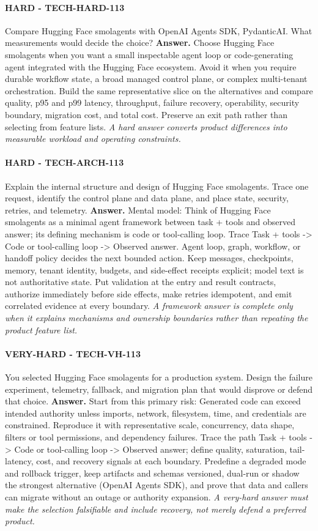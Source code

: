 \paragraph{HARD - TECH-HARD-113} Compare Hugging Face smolagents with OpenAI Agents SDK, PydanticAI. What measurements would decide the choice?
\textbf{Answer.} Choose Hugging Face smolagents when you want a small inspectable agent loop or code-generating agent integrated with the Hugging Face ecosystem. Avoid it when you require durable workflow state, a broad managed control plane, or complex multi-tenant orchestration. Build the same representative slice on the alternatives and compare quality, p95 and p99 latency, throughput, failure recovery, operability, security boundary, migration cost, and total cost. Preserve an exit path rather than selecting from feature lists.
\textit{A hard answer converts product differences into measurable workload and operating constraints.}
\paragraph{HARD - TECH-ARCH-113} Explain the internal structure and design of Hugging Face smolagents. Trace one request, identify the control plane and data plane, and place state, security, retries, and telemetry.
\textbf{Answer.} Mental model: Think of Hugging Face smolagents as a minimal agent framework between task + tools and observed answer; its defining mechanism is code or tool-calling loop. Trace Task + tools -> Code or tool-calling loop -> Observed answer. Agent loop, graph, workflow, or handoff policy decides the next bounded action. Keep messages, checkpoints, memory, tenant identity, budgets, and side-effect receipts explicit; model text is not authoritative state. Put validation at the entry and result contracts, authorize immediately before side effects, make retries idempotent, and emit correlated evidence at every boundary.
\textit{A framework answer is complete only when it explains mechanisms and ownership boundaries rather than repeating the product feature list.}
\paragraph{VERY-HARD - TECH-VH-113} You selected Hugging Face smolagents for a production system. Design the failure experiment, telemetry, fallback, and migration plan that would disprove or defend that choice.
\textbf{Answer.} Start from this primary risk: Generated code can exceed intended authority unless imports, network, filesystem, time, and credentials are constrained. Reproduce it with representative scale, concurrency, data shape, filters or tool permissions, and dependency failures. Trace the path Task + tools -> Code or tool-calling loop -> Observed answer; define quality, saturation, tail-latency, cost, and recovery signals at each boundary. Predefine a degraded mode and rollback trigger, keep artifacts and schemas versioned, dual-run or shadow the strongest alternative (OpenAI Agents SDK), and prove that data and callers can migrate without an outage or authority expansion.
\textit{A very-hard answer must make the selection falsifiable and include recovery, not merely defend a preferred product.}

